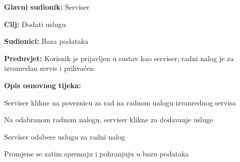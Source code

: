 \noindent {}
\begin{packed_item}
	
	\item \textbf{Glavni sudionik: } Serviser
	\item  \textbf{Cilj:} Dodati uslugu
	\item  \textbf{Sudionici:} Baza podataka
	\item  \textbf{Preduvjet:} Korisnik je prijavljen u sustav kao serviser, radni nalog je
	za izvanredan servis i prihvaćen
	\item  \textbf{Opis osnovnog tijeka:}
	
	\item[] \begin{packed_enum}
		
		\item Serviser klikne na poveznicu za rad na radnom nalogu izvanrednog servisa
		\item Na odabranom radnom nalogu, serviser klikne za dodavanje usluge
		\item Serviser odabere uslugu za radni nalog
		\item Promjene se zatim spremaju i pohranjuju u bazu podataka
		
	\end{packed_enum}
\end{packed_item}

